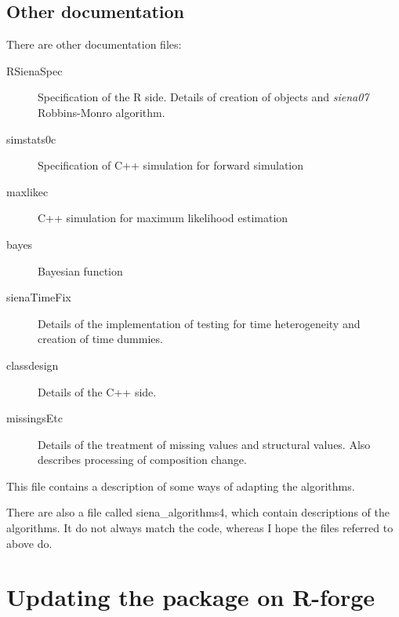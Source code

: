 \documentclass[12pt, a4paper]{article}
\renewcommand{\=}{\,=\,}
\newcommand{\+}{\,+\,}
\newcommand{\nnm}[1]{\textsf{\small\textit{#1}}}
\begin{document}
\subsection{Other documentation}
There are other documentation files:
\begin{description}
\item[RSienaSpec] Specification of the R side.  Details of creation of objects
  and \nnm{siena07} Robbins-Monro algorithm.
\item[simstats0c] Specification of C++ simulation for forward simulation
\item[maxlikec] C++ simulation for maximum likelihood estimation
\item[bayes] Bayesian function
\item[sienaTimeFix] Details of the implementation of testing for time
  heterogeneity and creation of time dummies.
\item[classdesign] Details of the C++ side.
\item[missingsEtc] Details of the treatment of missing values and structural
  values. Also describes processing of composition change.
\end{description}
This file contains a description of some ways of adapting the algorithms.

There are also a file called siena\_algorithms4,
which contain descriptions of the algorithms. It do not always match the
code, whereas I hope the files referred to above do.
\section{Updating the package on R-forge}
\end{document}
